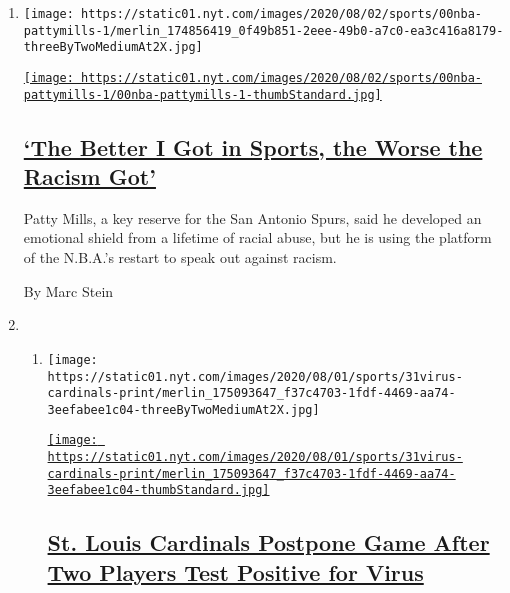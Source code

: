 \begin{enumerate}
\def\labelenumi{\arabic{enumi}.}
\item
  \texttt{[image: https://static01.nyt.com/images/2020/08/02/sports/00nba-pattymills-1/merlin\_174856419\_0f49b851-2eee-49b0-a7c0-ea3c416a8179-threeByTwoMediumAt2X.jpg]}

  \href{/2020/07/31/sports/basketball/spurs-patty-mills.html}{\texttt{[image: https://static01.nyt.com/images/2020/08/02/sports/00nba-pattymills-1/00nba-pattymills-1-thumbStandard.jpg]}}

  \hypertarget{the-better-i-got-in-sports-the-worse-the-racism-got}{%
  \subsection{\texorpdfstring{\href{/2020/07/31/sports/basketball/spurs-patty-mills.html}{`The
  Better I Got in Sports, the Worse the Racism
  Got'}}{`The Better I Got in Sports, the Worse the Racism Got'}}\label{the-better-i-got-in-sports-the-worse-the-racism-got}}

  Patty Mills, a key reserve for the San Antonio Spurs, said he
  developed an emotional shield from a lifetime of racial abuse, but he
  is using the platform of the N.B.A.'s restart to speak out against
  racism.

  By Marc Stein
\item
  \begin{enumerate}
  \def\labelenumii{\arabic{enumii}.}
  \item
    \texttt{[image: https://static01.nyt.com/images/2020/08/01/sports/31virus-cardinals-print/merlin\_175093647\_f37c4703-1fdf-4469-aa74-3eefabee1c04-threeByTwoMediumAt2X.jpg]}

    \href{/2020/07/31/sports/baseball/cardinals-twins-coronavirus-mlb.html}{\texttt{[image: https://static01.nyt.com/images/2020/08/01/sports/31virus-cardinals-print/merlin\_175093647\_f37c4703-1fdf-4469-aa74-3eefabee1c04-thumbStandard.jpg]}}

    \hypertarget{st-louis-cardinals-postpone-game-after-two-players-test-positive-for-virus}{%
    \subsection{\texorpdfstring{\href{/2020/07/31/sports/baseball/cardinals-twins-coronavirus-mlb.html}{St.
    Louis Cardinals Postpone Game After Two Players Test Positive for
    Virus}}{St. Louis Cardinals Postpone Game After Two Players Test Positive for Virus}}\label{st-louis-cardinals-postpone-game-after-two-players-test-positive-for-virus}}


\end{enumerate}
\end{enumerate}
